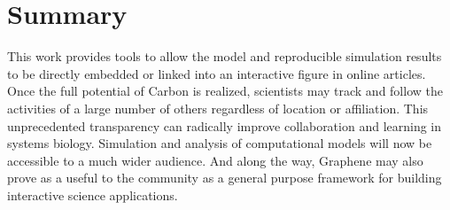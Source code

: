 \chapter{Summary}

This work provides tools to allow the model and reproducible simulation results to be directly embedded or linked into an interactive figure in online articles.
Once the full potential of Carbon is realized, scientists may track and follow the activities of a large number of others regardless of location or affiliation.
This unprecedented transparency can radically improve collaboration and learning in systems biology.
Simulation and analysis of computational models will now be accessible to a much wider audience.
And along the way, Graphene may also prove as a useful to the community as a general purpose framework for building interactive science applications.
